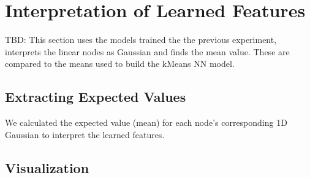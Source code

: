 
\section{Interpretation of Learned Features}
\label{sec:interpretation}

TBD: This section uses the models trained the the previous experiment, interprets the linear nodes as Gaussian and finds the mean value. These are compared to the means used to build the kMeans NN model.

\subsection{Extracting Expected Values}

We calculated the expected value (mean) for each node's corresponding 1D Gaussian to interpret the learned features.


\subsection{Visualization}


